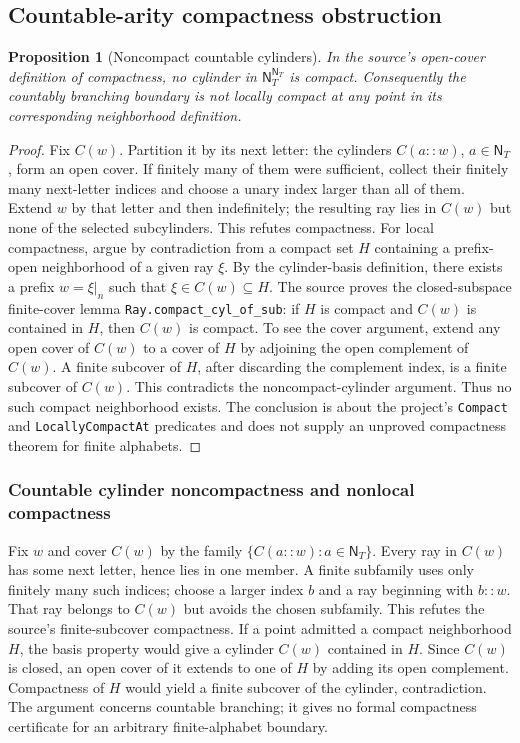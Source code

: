 \documentclass[11pt,reqno]{amsart}
\newtheorem{proposition}[theorem]{Proposition}
\theoremstyle{definition}\newtheorem{definition}[theorem]{Definition}
\theoremstyle{remark}\newtheorem{remark}[theorem]{Remark}
\newcommand{\N}{\mathsf N_T}\newcommand{\Z}{\mathsf Z_T}\newcommand{\Q}{\mathsf Q_T}\newcommand{\RR}{\mathsf R}
\begin{document}
\subsection{Countable-arity compactness obstruction}\label{main:sub-35}
\begin{proposition}[Noncompact countable cylinders]\label{prop:noncompact}
In the source's open-cover definition of compactness, no cylinder in $\N^{\N}$ is compact. Consequently the countably branching boundary is not locally compact at any point in its corresponding neighborhood definition.
\end{proposition}
\begin{proof}
Fix $C(w)$. Partition it by its next letter: the cylinders $C(a::w)$, $a\in\N$, form an open cover. If finitely many of them were sufficient, collect their finitely many next-letter indices and choose a unary index larger than all of them. Extend $w$ by that letter and then indefinitely; the resulting ray lies in $C(w)$ but none of the selected subcylinders. This refutes compactness. For local compactness, argue by contradiction from a compact set $H$ containing a prefix-open neighborhood of a given ray $\xi$. By the cylinder-basis definition, there exists a prefix $w=\xi|_n$ such that $\xi\in C(w)\subseteq H$. The source proves the closed-subspace finite-cover lemma \texttt{Ray.compact\_cyl\_of\_sub}: if $H$ is compact and $C(w)$ is contained in $H$, then $C(w)$ is compact. To see the cover argument, extend any open cover of $C(w)$ to a cover of $H$ by adjoining the open complement of $C(w)$. A finite subcover of $H$, after discarding the complement index, is a finite subcover of $C(w)$. This contradicts the noncompact-cylinder argument. Thus no such compact neighborhood exists. The conclusion is about the project's \texttt{Compact} and \texttt{LocallyCompactAt} predicates and does not supply an unproved compactness theorem for finite alphabets.
\end{proof}


\medskip
\subsubsection*{Countable cylinder noncompactness and nonlocal compactness}\label{supp:10-6}
Fix $w$ and cover $C(w)$ by the family $\{C(a::w):a\in\N\}$. Every ray in $C(w)$ has some next letter, hence lies in one member. A finite subfamily uses only finitely many such indices; choose a larger index $b$ and a ray beginning with $b::w$. That ray belongs to $C(w)$ but avoids the chosen subfamily. This refutes the source's finite-subcover compactness. If a point admitted a compact neighborhood $H$, the basis property would give a cylinder $C(w)$ contained in $H$. Since $C(w)$ is closed, an open cover of it extends to one of $H$ by adding its open complement. Compactness of $H$ would yield a finite subcover of the cylinder, contradiction. The argument concerns countable branching; it gives no formal compactness certificate for an arbitrary finite-alphabet boundary.
\medskip
\end{document}
